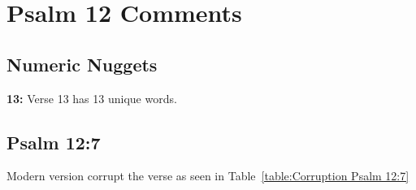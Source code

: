 \section{Psalm 12 Comments}

\subsection{Numeric Nuggets}
\textbf{13:} Verse 13 has 13 unique words.


\subsection{Psalm 12:7}
Modern version corrupt the verse as seen in Table~\ref{table:Corruption Psalm 12:7}


